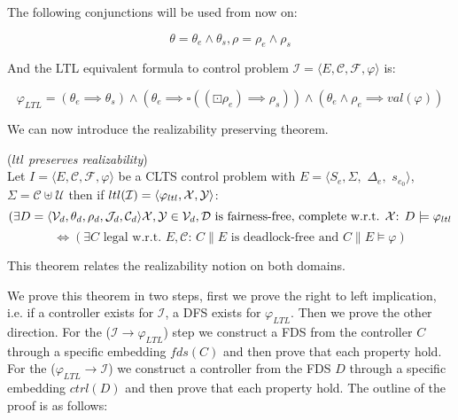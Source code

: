 The following conjunctions will be used from now on:

\[\theta = \theta_e \wedge \theta_s, \rho = \rho_e \wedge \rho_s \]

And the LTL equivalent formula to control problem $\mathcal{I} = \langle E, \mathcal{C}, \mathcal{F}, \varphi \rangle$ is:

\[ \varphi_{LTL} = (\theta_e \implies \theta_s) \wedge (\theta_e \implies \square((\boxdot \rho_e) \implies \rho_s)) \wedge (\theta_e \wedge \rho_e \implies val(\varphi)) \]

We can now introduce the realizability preserving theorem.

\begin{theorem}(\emph{$ltl$ preserves realizability})\label{theorem:gs_preserves_realizability}\\
	Let $I = \langle E, \mathcal{C}, \mathcal{F}, \varphi \rangle$ be a CLTS control problem with $E = \langle S_e,\Sigma,$ $\Delta_e,$ $s_{e_0}\rangle$, $\Sigma = \mathcal{C}\uplus \mathcal{U}$ then if $ltl(\mathcal{I}) = \langle \varphi_{ltl}, {\mathcal{X}}, {\mathcal{Y}}\rangle$:
	\small
	\[(\exists D= \langle \mathcal{V}_d, \theta_d, \rho_d, \mathcal{J}_d, \mathcal{C}_d\rangle    {\mathcal{X}}, {\mathcal{Y}} \in \mathcal{V}_d, \mathcal{D} \text{ is fairness-free, complete w.r.t. } {\mathcal{X}} \text{: } D \models \varphi_{ltl}\]
	 \[ \iff (\exists C \text{ legal w.r.t. } E,\mathcal{C} \text{: } C \parallel E \text{ is deadlock-free and } C \parallel E \models \varphi)  \]
	\normalsize
\end{theorem}

This theorem relates the realizability notion on both domains.

We prove this theorem in two steps, first we prove the right to left implication, i.e. if a controller exists for $\mathcal{I}$, a DFS exists for $\varphi_{LTL}$. Then we prove the other direction. For the ($\mathcal{I} \rightarrow \varphi_{LTL}$) step we construct a FDS from the controller $C$ through a specific embedding $fds(C)$ and then prove that each property hold. For the ($\varphi_{LTL} \rightarrow \mathcal{I}$) we construct a controller from the FDS $D$ through a specific embedding $ctrl(D)$ and then prove that each property hold. The outline of the proof is as follows:

